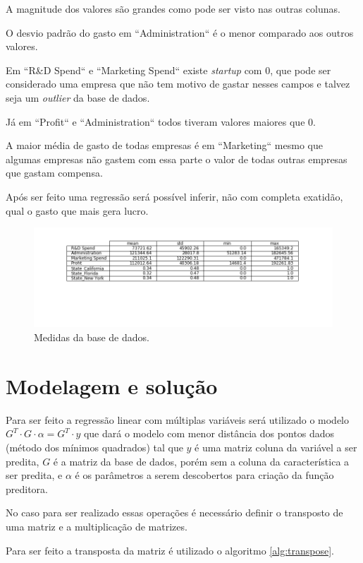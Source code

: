 \documentclass[11pt]{article}
\begin{document}
A magnitude dos valores são grandes como pode ser visto nas outras colunas.

O desvio padrão do gasto em ``Administration`` é o menor comparado aos outros valores.

Em ``R\&D Spend`` e ``Marketing Spend`` existe \emph{startup} com 0, que pode ser considerado uma empresa que não tem motivo de gastar nesses campos e talvez seja um \emph{outlier} da base de dados.

Já em ``Profit`` e ``Administration`` todos tiveram valores maiores que 0.

A maior média de gasto de todas empresas é em ``Marketing`` mesmo que algumas empresas não gastem com essa parte o valor de todas outras empresas que gastam compensa.

Após ser feito uma regressão será possível inferir, não com completa exatidão, qual o gasto que mais gera lucro.

\begin{figure}[htbp]
\centering
\includegraphics[width=.9\linewidth]{./data_set.png}
\caption{\label{fig:data_set}
Medidas da base de dados.}
\end{figure}


\section{Modelagem e solução}
\label{sec:orgf2ec1eb}

Para ser feito a regressão linear com múltiplas variáveis será utilizado o modelo \(G^T\cdot G\cdot \alpha = G^T\cdot y\) que dará o modelo com menor distância dos pontos dados (método dos mínimos quadrados) tal que \(y\) é uma matriz coluna da variável a ser predita, \(G\) é a matriz da base de dados, porém sem a coluna da característica a ser predita, e \(\alpha\) é os parâmetros a serem descobertos para criação da função preditora.

No caso para ser realizado essas operações é necessário definir o transposto de uma matriz e a multiplicação de matrizes.

Para ser feito a transposta da matriz é utilizado o algoritmo \ref{alg:transpose}.
\end{document}
